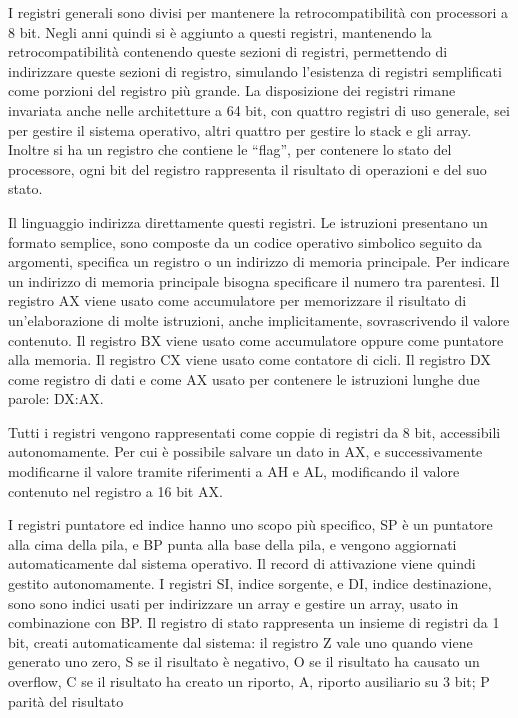 \documentclass{article}
\numberwithin{equation}{subsection}
\begin{document}

I registri generali sono divisi per mantenere la retrocompatibilità con processori a 8 bit. 
Negli anni quindi si è aggiunto a questi registri, mantenendo la retrocompatibilità contenendo queste sezioni di registri, permettendo di indirizzare queste sezioni di 
registro, simulando l'esistenza di registri semplificati come porzioni del registro più grande. 
La disposizione dei registri rimane invariata anche nelle architetture a 64 bit, con quattro registri di uso generale, sei per gestire il sistema operativo, altri quattro per 
gestire lo stack e gli array. Inoltre si ha un registro che contiene le ``flag'', per contenere lo stato del processore, ogni bit del registro rappresenta il risultato 
di operazioni e del suo stato. 

Il linguaggio indirizza direttamente questi registri. Le istruzioni presentano un formato semplice, sono composte da un codice operativo simbolico seguito da argomenti, 
specifica un registro o un indirizzo di memoria principale. Per indicare un indirizzo di memoria principale bisogna specificare il numero tra parentesi. 
Il registro AX viene usato come accumulatore per memorizzare il risultato di un'elaborazione di molte istruzioni, anche implicitamente, sovrascrivendo il valore contenuto. 
Il registro BX viene usato come accumulatore oppure come puntatore alla memoria. Il registro CX viene usato come contatore di cicli. Il registro DX come registro di dati e come AX 
usato per contenere le istruzioni lunghe due parole: DX:AX. 

Tutti i registri vengono rappresentati come coppie di registri da 8 bit, accessibili autonomamente. Per cui è possibile salvare un dato in AX, e successivamente modificarne 
il valore tramite riferimenti a AH e AL, modificando il valore contenuto nel registro a 16 bit AX. 

I registri puntatore ed indice hanno uno scopo più specifico, SP è un puntatore alla cima della pila, e BP punta alla base della pila, e vengono aggiornati automaticamente 
dal sistema operativo. Il record di attivazione viene quindi gestito autonomamente. 
I registri SI, indice sorgente, e DI, indice destinazione, sono sono indici usati per indirizzare un array e gestire un array, usato in combinazione con BP. 
Il registro di stato rappresenta un insieme di registri da 1 bit, creati automaticamente dal sistema: il registro Z vale uno quando viene generato uno zero, S se il risultato è 
negativo, O se il risultato ha causato un overflow, C se il risultato ha creato un riporto, A, riporto ausiliario su 3 bit; P parità del risultato %
\end{document}
